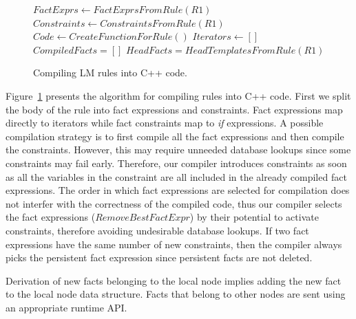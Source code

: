 \begin{figure}
\begin{algorithm}[H]
 $FactExprs \longleftarrow FactExprsFromRule(R1)$\;
 $Constraints \longleftarrow ConstraintsFromRule(R1)$\;
 $Code \longleftarrow CreateFunctionForRule()$\;
 $Iterators \longleftarrow []$\;
 $CompiledFacts = []$\;
 $HeadFacts = HeadTemplatesFromRule(R1)$\;
\end{algorithm}
 \caption{Compiling LM rules into C++ code.}
 \label{alg:compile_rule}
\end{figure}

Figure~\ref{alg:compile_rule} presents the algorithm for compiling rules into
C++ code. First we split the body of the rule into fact expressions and
constraints. Fact expressions map directly to iterators while fact constraints
map to \emph{if} expressions. A possible compilation strategy is to first
compile all the fact expressions and then compile the constraints. However, this
may require unneeded database lookups since some constraints may fail early.
Therefore, our compiler introduces constraints as soon as all the variables in
the constraint are all included in the already compiled fact expressions. The
order in which fact expressions are selected for compilation does not interfer
with the correctness of the compiled code, thus our compiler selects the fact
expressions ($RemoveBestFactExpr$) by their potential to activate constraints,
therefore avoiding undesirable database lookups. If two fact expressions have
the same number of new constraints, then the compiler always picks the
persistent fact expression since persistent facts are not deleted.

Derivation of new facts belonging to the local node implies adding the new fact
to the local node data structure. Facts that belong to other nodes are sent
using an appropriate runtime API.

